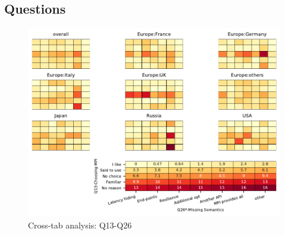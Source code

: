 
\subsection{Questions}


\begin{figure}
\begin{center}
\includegraphics[width=12cm]{../pdfs/Q13-Q26.pdf}
\caption{Cross-tab analysis: Q13-Q26}
\label{fig:Q13-Q26}
\end{center}
\end{figure}
